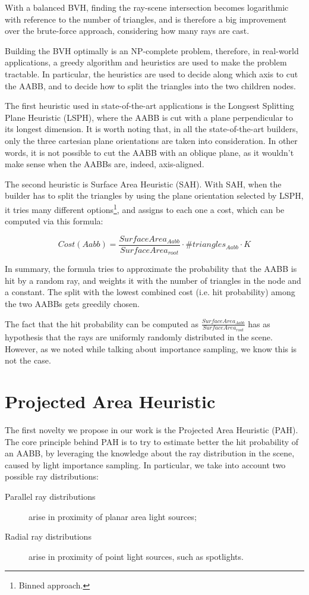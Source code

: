 \documentclass[11pt,a4paper,twocolumn]{article}
\begin{document}
With a balanced BVH, finding the ray-scene intersection becomes logarithmic with reference to the number of triangles, and is therefore a big improvement over the brute-force approach, considering how many rays are cast.

Building the BVH optimally is an NP-complete problem, therefore, in real-world applications, a greedy algorithm and heuristics are used to make the problem tractable. In particular, the heuristics are used to decide along which axis to cut the AABB, and to decide how to split the triangles into the two children nodes.

The first heuristic used in state-of-the-art applications is the Longsest Splitting Plane Heuristic (LSPH), where the AABB is cut with a plane perpendicular to its longest dimension. It is worth noting that, in all the state-of-the-art builders, only the three cartesian plane orientations are taken into consideration. In other words, it is not possible to cut the AABB with an oblique plane, as it wouldn't make sense when the AABBs are, indeed, axis-aligned.

The second heuristic is Surface Area Heuristic (SAH). With SAH, when the builder has to split the triangles by using the plane orientation selected by LSPH, it tries many different options\footnote{Binned approach.}, and assigns to each one a cost, which can be computed via this formula:

$$
Cost(Aabb) = \frac{SurfaceArea_{Aabb}}{SurfaceArea_{root}} \cdot \#triangles_{Aabb} \cdot K
$$

In summary, the formula tries to approximate the probability that the AABB is hit by a random ray, and weights it with the number of triangles in the node and a constant. The split with the lowest combined cost (i.e. hit probability) among the two AABBs gets greedily chosen.

The fact that the hit probability can be computed as $\frac{SurfaceArea_{Aabb}}{SurfaceArea_{root}}$ has as hypothesis that the rays are uniformly randomly distributed in the scene. However, as we noted while talking about importance sampling, we know this is not the case.

\section{Projected Area Heuristic}
The first novelty we propose in our work is the Projected Area Heuristic (PAH). The core principle behind PAH is to try to estimate better the hit probability of an AABB, by leveraging the knowledge about the ray distribution in the scene, caused by light importance sampling. In particular, we take into account two possible ray distributions:
\begin{description}
    \item[Parallel ray distributions] arise in proximity of planar area light sources;
    \item[Radial ray distributions] arise in proximity of point light sources, such as spotlights. 
\end{description}
\end{document}
